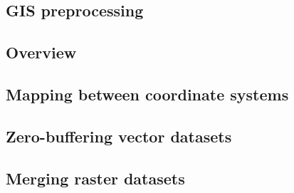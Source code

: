 \begin{appendices}
  \section{GIS preprocessing}
  \subsection{Overview}%
  
  \subsection{Mapping between coordinate systems}%
  \label{app:srid-change}
  
  \subsection{Zero-buffering vector datasets}%
  \label{app:zero-buffer}
  
  \subsection{Merging raster datasets}%
  \label{app:raster-merging}
  
\end{appendices}
